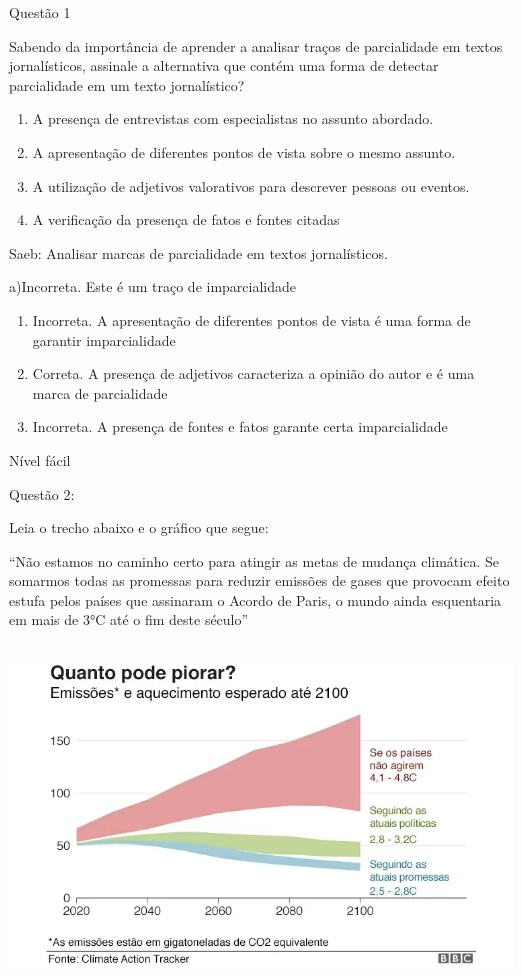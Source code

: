 Questão 1

Sabendo da importância de aprender a analisar traços de parcialidade em
textos jornalísticos, assinale a alternativa que contém uma forma de
detectar parcialidade em um texto jornalístico?

\begin{enumerate}
\def\labelenumi{\alph{enumi})}
\item
  A presença de entrevistas com especialistas no assunto abordado.
\item
  A apresentação de diferentes pontos de vista sobre o mesmo assunto.
\item
  A utilização de adjetivos valorativos para descrever pessoas ou
  eventos.
\item
  A verificação da presença de fatos e fontes citadas
\end{enumerate}

Saeb: Analisar marcas de parcialidade em textos jornalísticos.

a)Incorreta. Este é um traço de imparcialidade

\begin{enumerate}
\def\labelenumi{\arabic{enumi}.}
\item
  Incorreta. A apresentação de diferentes pontos de vista é uma forma de
  garantir imparcialidade
\item
  Correta. A presença de adjetivos caracteriza a opinião do autor e é
  uma marca de parcialidade
\item
  Incorreta. A presença de fontes e fatos garante certa imparcialidade
\end{enumerate}

Nível fácil

Questão 2:

Leia o trecho abaixo e o gráfico que segue:

``Não estamos no caminho certo para atingir as metas de mudança
climática. Se somarmos todas as promessas para reduzir emissões de gases
que provocam efeito estufa pelos países que assinaram o Acordo de Paris,
o mundo ainda esquentaria em mais de 3°C até o fim deste século''

\includegraphics[width=5.90551in,height=3.56944in]{./imgSAEB_7_POR/media/image8.png}

